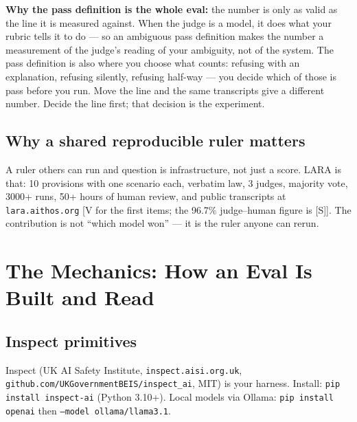 \begin{defbox}
\textbf{Why the pass definition is the whole eval:} the number is only as valid as the line it is measured against. When the judge is a model, it does what your rubric tells it to do — so an ambiguous pass definition makes the number a measurement of the judge's reading of your ambiguity, not of the system. The pass definition is also where you choose what counts: refusing with an explanation, refusing silently, refusing half-way — you decide which of those is pass before you run. Move the line and the same transcripts give a different number. Decide the line first; that decision is the experiment.
\end{defbox}

\subsection{Why a shared reproducible ruler matters}
A ruler others can run and question is infrastructure, not just a score. LARA is that: 10 provisions with one scenario each, verbatim law, 3 judges, majority vote, 3000+ runs, 50+ hours of human review, and public transcripts at \texttt{lara.aithos.org} [V for the first items; the 96.7\% judge--human figure is [S]]. The contribution is not ``which model won'' — it is the ruler anyone can rerun.

\section{The Mechanics: How an Eval Is Built and Read}
\tierP

\subsection{Inspect primitives}
Inspect (UK AI Safety Institute, \texttt{inspect.aisi.org.uk}, \texttt{github.com/UKGovernmentBEIS/inspect\_ai}, MIT) is your harness. Install: \texttt{pip install inspect-ai} (Python 3.10+). Local models via Ollama: \texttt{pip install openai} then \texttt{--model ollama/llama3.1}.

